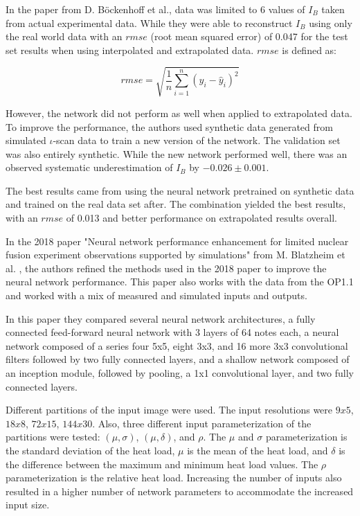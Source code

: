 In the paper from D. Böckenhoff et al., data was limited to 6 values of $I_B$ taken from actual experimental data. While they were able to reconstruct $I_B$ using only the real world data with an $rmse$ (root mean squared error) of 0.047 for the test set results when using interpolated and extrapolated data. $rmse$ is defined as:

\begin{equation}
    rmse = \sqrt{\frac{1}{n}\sum_{i=1}^{n}(y_i - \hat{y}_i)^2}
\end{equation}

However, the network did not perform as well when applied to extrapolated data. To improve the performance, the authors used synthetic data generated from simulated $\iota$-scan data to train a new version of the network. The validation set was also entirely synthetic. While the new network performed well, there was an observed systematic underestimation of $I_B$ by $-0.026 \pm 0.001$.

The best results came from using the neural network pretrained on synthetic data and trained on the real data set after. The combination yielded the best results, with an $rmse$ of 0.013 and better performance on extrapolated results overall.

In the 2018 paper "Neural network performance enhancement for limited nuclear fusion experiment observations supported by simulations" from M. Blatzheim et al. \cite{Blatzheim_2018}, the authors refined the methods used in the 2018 paper to improve the neural network performance. This paper also works with the data from the OP1.1 and worked with a mix of measured and simulated inputs and outputs.

In this paper they compared several neural network architectures, a fully connected feed-forward neural network with 3 layers of 64 notes each, a neural network composed of a series four 5x5, eight 3x3, and 16 more 3x3 convolutional filters followed by two fully connected layers, and a shallow network composed of an inception module, followed by pooling, a 1x1 convolutional layer, and two fully connected layers.

Different partitions of the input image were used. The input resolutions were $9x5$, $18x8$, $72x15$, $144x30$. Also, three different input parameterization of the partitions were tested: $(\mu, \sigma)$, $(\mu, \delta)$, and $\rho$. The $\mu$ and $\sigma$ parameterization is the standard deviation of the heat load, $\mu$ is the mean of the heat load, and $\delta$ is the difference between the maximum and minimum heat load values. The $\rho$ parameterization is the relative heat load. Increasing the number of inputs also resulted in a higher number of network parameters to accommodate the increased input size.

